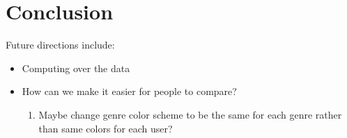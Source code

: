 \documentclass[journal]{vgtc}                %
\begin{document}
\section{Conclusion}

Future directions include:
\begin{itemize}
  \item Computing over the data
  \item How can we make it easier for people to compare?
  \begin{enumerate}
    \item Maybe change genre color scheme to be the same for each genre rather than same colors for each user?
  \end{enumerate}
\end{itemize}


%

%
%
%


\end{document}
